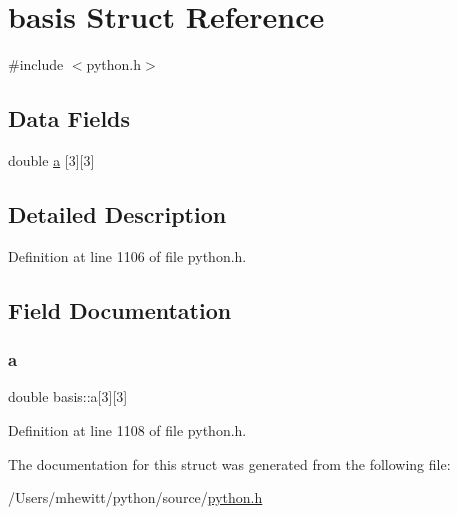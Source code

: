\hypertarget{structbasis}{}\section{basis Struct Reference}
\label{structbasis}


{\ttfamily \#include $<$python.\+h$>$}

\subsection*{Data Fields}
\begin{DoxyCompactItemize}
\item 
double \hyperlink{structbasis_a2180e7f1bc7f3287b1841f9d6452d225}{a} \mbox{[}3\mbox{]}\mbox{[}3\mbox{]}
\end{DoxyCompactItemize}


\subsection{Detailed Description}


Definition at line 1106 of file python.\+h.



\subsection{Field Documentation}
\mbox{\label{structbasis_a2180e7f1bc7f3287b1841f9d6452d225}} 
\subsubsection{\texorpdfstring{a}{a}}
{\footnotesize\ttfamily double basis\+::a\mbox{[}3\mbox{]}\mbox{[}3\mbox{]}}



Definition at line 1108 of file python.\+h.



The documentation for this struct was generated from the following file\+:\begin{DoxyCompactItemize}
\item 
/\+Users/mhewitt/python/source/\hyperlink{python_8h}{python.\+h}\end{DoxyCompactItemize}
